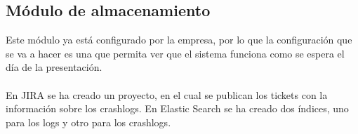 \subsection{Módulo de almacenamiento}
Este módulo ya está configurado por la empresa, por lo que la configuración que se va a hacer es una que permita ver que el sistema funciona como se espera el día de la presentación.
\\\\
En JIRA se ha creado un proyecto, en el cual se publican los tickets con la información sobre los crashlogs.
En Elastic Search se ha creado dos índices, uno para los logs y otro para los crashlogs.


